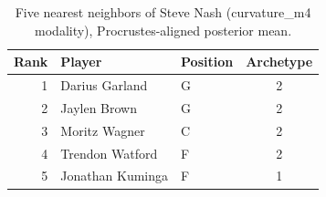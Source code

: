 \begin{table}[htbp]
  \centering\small
  \begin{tabular}{rllc}
    \toprule
    Rank & Player & Position & Archetype \\
    \midrule
    1 & Darius Garland & G & 2 \\
    2 & Jaylen Brown & G & 2 \\
    3 & Moritz Wagner & C & 2 \\
    4 & Trendon Watford & F & 2 \\
    5 & Jonathan Kuminga & F & 1 \\
    \bottomrule
  \end{tabular}
  \caption{Five nearest neighbors of Steve Nash (curvature_m4 modality), Procrustes-aligned posterior mean.}
  \label{tab:Steve_Nash_neighbors_curvature_m4}
\end{table}

